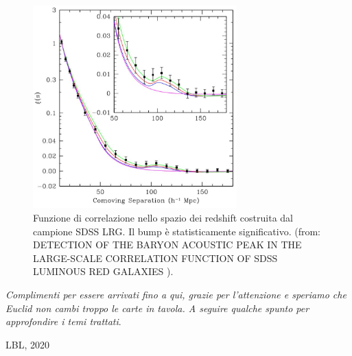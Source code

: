 \begin{figure}[H]
    \centering
    \includegraphics[width=0.7\textwidth]{Pictures/11/baoobs.jpg}
    \caption{Funzione di correlazione nello spazio dei redshift costruita dal campione SDSS LRG. Il bump è statisticamente significativo. (from: DETECTION OF THE BARYON ACOUSTIC PEAK IN THE LARGE-SCALE
    CORRELATION FUNCTION OF SDSS LUMINOUS RED GALAXIES
    ).}\label{fig11:baoobs}
\end{figure}

\textit{Complimenti per essere arrivati fino a qui, grazie per l'attenzione e speriamo che Euclid non cambi troppo le carte in tavola. A seguire qualche spunto per approfondire i temi trattati}.

\vspace{1em}
\begin{flushright}
LBL, 2020
\end{flushright}